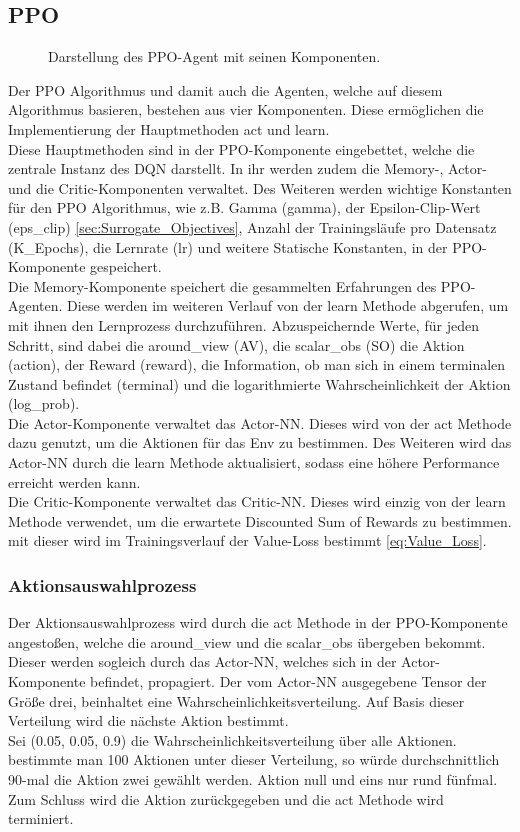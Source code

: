 \subsection{PPO}
\begin{figure}[H]
	\centering
	\def\svgscale{0.18}
	
	\caption[PPO-Agent]{Darstellung des PPO-Agent mit seinen Komponenten.}
	\label{fig:PPO-Agent}
\end{figure}
Der PPO Algorithmus und damit auch die Agenten, welche auf diesem Algorithmus basieren, bestehen aus vier Komponenten. Diese ermöglichen die Implementierung der Hauptmethoden act und learn.\\
Diese Hauptmethoden sind in der PPO-Komponente eingebettet, welche die zentrale Instanz des DQN darstellt. In ihr werden zudem die Memory-, Actor- und die Critic-Komponenten verwaltet. Des Weiteren werden wichtige Konstanten für den PPO Algorithmus, wie z.B. Gamma (gamma), der Epsilon-Clip-Wert (eps\_clip) \ref{sec:Surrogate_Objectives}, Anzahl der Trainingsläufe pro Datensatz (K\_Epochs), die Lernrate (lr) und weitere Statische Konstanten, in der PPO-Komponente gespeichert.\\
Die Memory-Komponente speichert die gesammelten Erfahrungen des PPO-Agenten. Diese werden im weiteren Verlauf von der learn Methode abgerufen, um mit ihnen den Lernprozess durchzuführen. Abzuspeichernde Werte, für jeden Schritt, sind dabei die around\_view (AV), die scalar\_obs (SO) die Aktion (action), der Reward (reward), die Information, ob man sich in einem terminalen Zustand befindet (terminal) und die logarithmierte Wahrscheinlichkeit der Aktion (log\_prob). \\
Die Actor-Komponente verwaltet das Actor-NN. Dieses wird von der act Methode dazu genutzt, um die Aktionen für das Env zu bestimmen. Des Weiteren wird das Actor-NN durch die learn Methode aktualisiert, sodass eine höhere Performance erreicht werden kann.\\
Die Critic-Komponente verwaltet das Critic-NN. Dieses wird einzig von der learn Methode verwendet, um die erwartete Discounted Sum of Rewards zu bestimmen. mit dieser wird im Trainingsverlauf der Value-Loss bestimmt \ref{eq:Value_Loss}.

\subsubsection{Aktionsauswahlprozess}
Der Aktionsauswahlprozess wird durch die act Methode in der PPO-Komponente angestoßen, welche die around\_view und die scalar\_obs übergeben bekommt. Dieser werden sogleich durch das Actor-NN, welches sich in der Actor-Komponente befindet, propagiert. Der vom Actor-NN ausgegebene Tensor der Größe drei, beinhaltet eine Wahrscheinlichkeitsverteilung. Auf Basis dieser Verteilung wird die nächste Aktion bestimmt.\\
Sei (0.05, 0.05, 0.9) die Wahrscheinlichkeitsverteilung über alle Aktionen. bestimmte man 100 Aktionen unter dieser Verteilung, so würde durchschnittlich 90-mal die Aktion zwei gewählt werden. Aktion null und eins nur rund fünfmal.\\
Zum Schluss wird die Aktion zurückgegeben und die act Methode wird terminiert.

